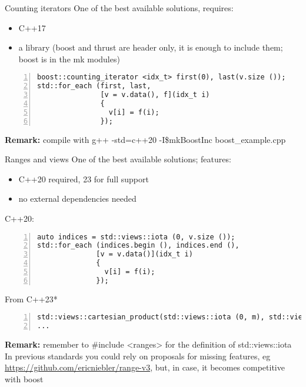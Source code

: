 \documentclass[10pt,aspectratio=169]{beamer}
\begin{document}
\begin{frame}[fragile]{Counting iterators}
One of the best available solutions, requires:
\begin{itemize}
    \item C++17
    \item a library (boost and thrust are header only, it is enough to include them; boost is in the mk modules)
\end{itemize}

\begin{lstlisting}[frame=single, style=cpp, firstnumber=1, numbers=left, numberstyle=\tiny,showtabs=false,xleftmargin=.05\linewidth,xrightmargin=.025\linewidth]
boost::counting_iterator <idx_t> first(0), last(v.size ());
std::for_each (first, last, 
               [v = v.data(), f](idx_t i) 
               {
                 v[i] = f(i);
               });
\end{lstlisting}
\textbf{Remark:} compile with {\ttfamily g++ -std=c++20 -I\$mkBoostInc boost\_example.cpp}
\end{frame}

\begin{frame}[fragile]{Ranges and views}
One of the best available solutions; features:
\begin{itemize}
    \item C++20 required, 23 for full support
    \item no external dependencies needed
\end{itemize}
C++20:
\begin{lstlisting}[frame=single, style=cpp, firstnumber=1, numbers=left, numberstyle=\tiny,showtabs=false,xleftmargin=.05\linewidth,xrightmargin=.025\linewidth]
auto indices = std::views::iota (0, v.size ());
std::for_each (indices.begin (), indices.end (),
              [v = v.data()](idx_t i) 
              {
                v[i] = f(i);
              });
\end{lstlisting}
From C++23* 
\begin{lstlisting}[frame=single, style=cpp, firstnumber=1, numbers=left, numberstyle=\tiny,showtabs=false,xleftmargin=.05\linewidth,xrightmargin=.025\linewidth]
std::views::cartesian_product(std::views::iota (0, m), std::views::iota (0, n));
...
\end{lstlisting}
\textbf{Remark:} remember to {\ttfamily \#include <ranges>} for the definition of {\ttfamily std::views::iota}\\\bigskip
\vfill
{\small  *In previous standards you could rely on proposals for missing features, eg\\ \href{https://github.com/ericniebler/range-v3}{\color{blue}https://github.com/ericniebler/range-v3}, but, in case, it becomes competitive with boost}
\end{frame}
\end{document}
